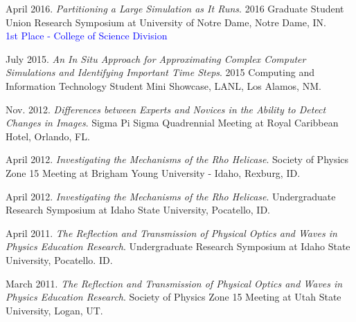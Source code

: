 \begin{etaremune}[topsep=0pt, itemsep=2.5pt, partopsep=0pt, parsep=0pt]
    \item April 2016. \textit{Partitioning a Large Simulation as It Runs}. 2016 Graduate Student Union Research Symposium at University of Notre Dame, Notre Dame, IN.\\
    \textcolor{blue}{1st Place - College of Science Division}
    
    \item July 2015. \textit{An In Situ Approach for Approximating Complex Computer Simulations and Identifying Important Time Steps}. 2015 Computing and Information Technology Student Mini Showcase, LANL, Los Alamos, NM.
    
    \item Nov. 2012. \textit{Differences between Experts and Novices in the Ability to Detect Changes in Images}. Sigma Pi Sigma Quadrennial Meeting at Royal Caribbean Hotel, Orlando, FL.
    
    \item April 2012. \textit{Investigating the Mechanisms of the Rho Helicase}. Society of Physics Zone 15 Meeting at Brigham Young University - Idaho, Rexburg, ID.
    
    \item April 2012. \textit{Investigating the Mechanisms of the Rho Helicase}. Undergraduate Research Symposium at Idaho State University, Pocatello, ID.
    
    \item April 2011. \textit{The Reflection and Transmission of Physical Optics and Waves in Physics Education Research}. Undergraduate Research Symposium at Idaho State University, Pocatello. ID.
    
    \item March 2011. \textit{The Reflection and Transmission of Physical Optics and Waves in Physics Education Research}. Society of Physics Zone 15 Meeting at Utah State University, Logan, UT.
\end{etaremune}